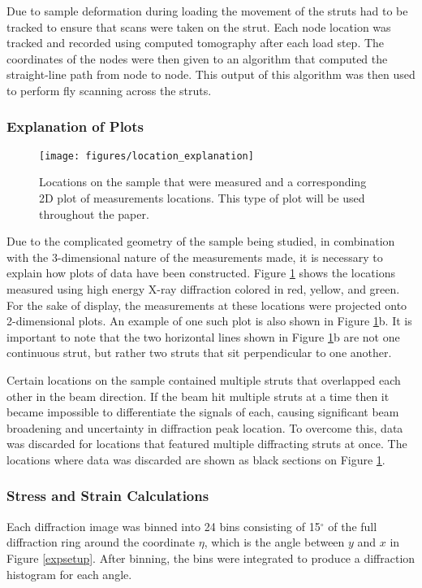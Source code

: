 Due to sample deformation during loading the movement of the struts had to be tracked to ensure that scans were taken on the strut. Each node location was tracked and recorded using computed tomography after each load step. The coordinates of the nodes were then given to an algorithm that computed the straight-line path from node to node. This output of this algorithm was then used to perform fly scanning across the struts.

\subsubsection{Explanation of Plots}
\begin{figure}
	\texttt{[image: figures/location\_explanation]}
	\caption{Locations on the sample that were measured and a corresponding 2D plot of measurements locations. This type of plot will be used throughout the paper.}
	\label{location_explanation}
\end{figure}
Due to the complicated geometry of the sample being studied, in combination with the 3-dimensional nature of the measurements made, it is necessary to explain how plots of data have been constructed. Figure \ref{location_explanation} shows the locations measured using high energy X-ray diffraction colored in red, yellow, and green. For the sake of display, the measurements at these locations were projected onto 2-dimensional plots. An example of one such plot is also shown in Figure \ref{location_explanation}b. It is important to note that the two horizontal lines shown in Figure \ref{location_explanation}b are not one continuous strut, but rather two struts that sit perpendicular to one another.

Certain locations on the sample contained multiple struts that overlapped each other in the beam direction. If the beam hit multiple struts at a time then it became impossible to differentiate the signals of each, causing significant beam broadening and uncertainty in diffraction peak location. To overcome this, data was discarded for locations that featured multiple diffracting struts at once. The locations where data was discarded are shown as black sections on Figure \ref{location_explanation}.

\subsubsection{Stress and Strain Calculations}
Each diffraction image was binned into 24 bins consisting of 15$^\circ$ of the full diffraction ring around the coordinate $\eta$, which is the angle between $y$ and $x$ in Figure \ref{expsetup}. After binning, the bins were integrated to produce a diffraction histogram for each angle.

